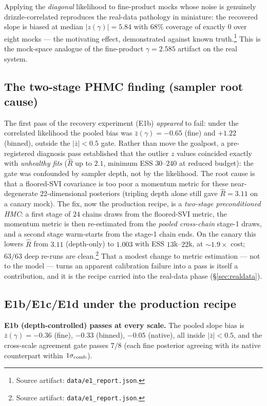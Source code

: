 \documentclass[11pt,letterpaper]{article}
\newcommand{\gammaEPL}{\ensuremath{\gamma}}
\newcommand{\Rhat}{\ensuremath{\hat{R}}}
\newcommand{\art}[1]{\footnote{Source artifact: \texttt{#1}.}}
\begin{document}
Applying the {\it diagonal} likelihood to fine-product mocks whose noise is
genuinely drizzle-correlated reproduces the real-data pathology in miniature:
the recovered slope is biased at median $|z(\gammaEPL)|=5.84$ with $68\%$
coverage of exactly $0$ over eight mocks --- the motivating effect,
demonstrated against known truth.\art{data/e1\_report.json} This is the
mock-space analogue of the fine-product $\gammaEPL=2.585$ artifact on the real
system.

\subsection{The two-stage PHMC finding (sampler root cause)}
\label{sec:twostage}

The first pass of the recovery experiment (E1b) {\it appeared} to fail: under
the correlated likelihood the pooled bias was $\bar z(\gammaEPL)=-0.65$ (fine)
and $+1.22$ (binned), outside the $|\bar z|<0.5$ gate. Rather than move the
goalpost, a pre-registered diagnosis pass established that the outlier $z$
values coincided exactly with {\it unhealthy fits} ($\Rhat$ up to $2.1$,
minimum ESS $30$--$240$ at reduced budget): the gate was confounded by sampler
depth, not by the likelihood. The root cause is that a floored-SVI covariance is
too poor a momentum metric for these near-degenerate $22$-dimensional
posteriors (tripling depth alone still gave $\Rhat=3.11$ on a canary mock). The
fix, now the production recipe, is a {\it two-stage preconditioned HMC}: a first
stage of $24$ chains draws from the floored-SVI metric, the momentum metric is
then re-estimated from the {\it pooled cross-chain} stage-1 draws, and a second
stage warm-starts from the stage-1 chain ends. On the canary this lowers $\Rhat$
from $3.11$ (depth-only) to $1.003$ with ESS $13$k--$22$k, at $\sim$$1.9\times$
cost; $63/63$ deep re-runs are clean.\art{data/e1\_report.json} That a modest
change to metric estimation --- not to the model --- turns an apparent
calibration failure into a pass is itself a contribution, and it is the recipe
carried into the real-data phase (\S\ref{sec:realdata}).

\subsection{E1b/E1c/E1d under the production recipe}

{\bf E1b (depth-controlled) passes at every scale.} The pooled slope bias is
$\bar z(\gammaEPL)=-0.36$ (fine), $-0.33$ (binned), $-0.05$ (native), all inside
$|\bar z|<0.5$, and the cross-scale agreement gate passes $7/8$ (each fine
posterior agreeing with its native counterpart within $1\sigma_{\rm comb}$).
\end{document}
